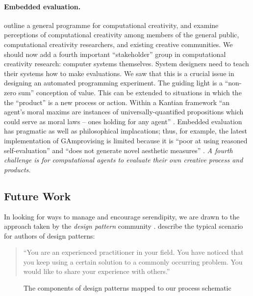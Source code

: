 \paragraph{\textbf{Embedded evaluation}.}   outline a general programme
  for computational creativity, and examine perceptions of
  computational creativity among members of the general public,
  computational creativity researchers, and existing creative
  communities.  We should now add a fourth important ``stakeholder''
  group in computational creativity research: computer systems
  themselves.  System designers need to teach their systems how to
  make evaluations.  We saw that this is a crucial issue in designing
  an automated programming experiment.  The guiding light is a
  ``non-zero sum'' conception of value.  This can be extended to
  situations in which the the ``product'' is a new process or action.
  Within a Kantian framework ``an agent's moral maxims are instances
  of universally-quantified propositions which could serve as moral
  laws -- ones holding for any agent'' \cite{powers2005deontological}.
  Embedded evaluation has pragmatic as well as philosophical
  implacations; thus, for example, the latest implementation of {\sf
    GAmprovising} is limited because it is ``poor at using reasoned
  self-evaluation'' and ``does not generate novel aesthetic measures''
  \cite[pp.~189, 288]{jordanous2012evaluating}.  \emph{A fourth
    challenge is for computational agents to evaluate their own
    creative process and products.}

\subsection{Future Work} \label{sec:futurework} \label{sec:hatching}

In looking for ways to manage and encourage serendipity, we are drawn
to the approach taken by the \emph{design pattern} community
\cite{alexander1999origins}. 
 describe the typical scenario for authors of design patterns:

\begin{quote}
\noindent ``You are an experienced practitioner in your field.  You
have noticed that you keep using a certain solution to a commonly
occurring problem.  You would like to share your experience with
others.''
\end{quote}

\begin{figure}[!t]
\vspace{.3cm}

\vspace{-.3cm}
\caption{The components of design patterns mapped to our process schematic\label{fig:pattern-schematic}}
\vspace{.5cm}
\end{figure}


